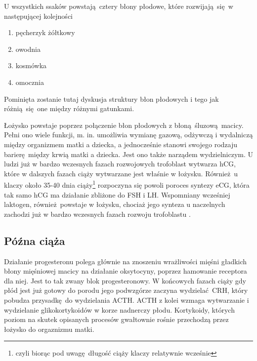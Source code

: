 \documentclass[two column, twoside, a4paper]{article}
\begin{document}
U wszystkich ssaków powstają cztery błony płodowe, które rozwijają się w następującej kolejności
\begin{enumerate}
	\item pęcherzyk żółtkowy
	\item owodnia
	\item kosmówka
	\item omocznia
\end{enumerate}

Pominięta zostanie tutaj dyskusja struktury błon płodowych i tego jak różnią się one między różnymi gatunkami.

Łożysko powstaje poprzez połączenie błon płodowych z błoną śluzową macicy. Pełni ono wiele funkcji, m. in. umożliwia wymianę gazową, odżywczą i wydalniczą między organizmem matki a dziecka, a jednocześnie stanowi swojego rodzaju barierę między krwią matki a dziecka. Jest ono także narządem wydzielniczym. U ludzi już w bardzo wczesnych fazach rozwojowych trofoblast wytwarza hCG, które w dalszych fazach ciąży wytwarzane jest właśnie w łożysku. Również u klaczy około 35-40 dnia ciąży\footnote{czyli biorąc pod uwagę długość ciąży klaczy relatywnie wcześnie} rozpoczyna się powoli poroces syntezy eCG, która tak samo hCG ma działanie zbliżone do FSH i LH. Wspomniany wcześniej laktogen, również powstaje w łożysku, chociaż jego synteza u naczelnych zachodzi już w bardzo wczesnych fazach rozwoju trofoblastu \autocite{Krzymowski2005, Sadler2012}.

\subsection{Późna ciąża}

Działanie progesteronu polega głównie na znoszeniu wrażliwości mięśni gładkich błony mięśniowej macicy na działanie oksytocyny, poprzez hamowanie receptora dla niej. Jest to tak zwany blok progesteronowy. W końcowych fazach ciąży gdy płód jest już gotowy do porodu jego podwzgórze zaczyna wydzielać CRH, który pobudza przysadkę do wydzielania ACTH. ACTH z kolei wzmaga wytwarzanie i wydzielanie glikokortykoidów w korze nadnerczy płodu. Kortykoidy, których poziom na skutek opisanych procesów gwałtownie rośnie przechodzą przez łożysko do orgaznizmu matki.
\end{document}
